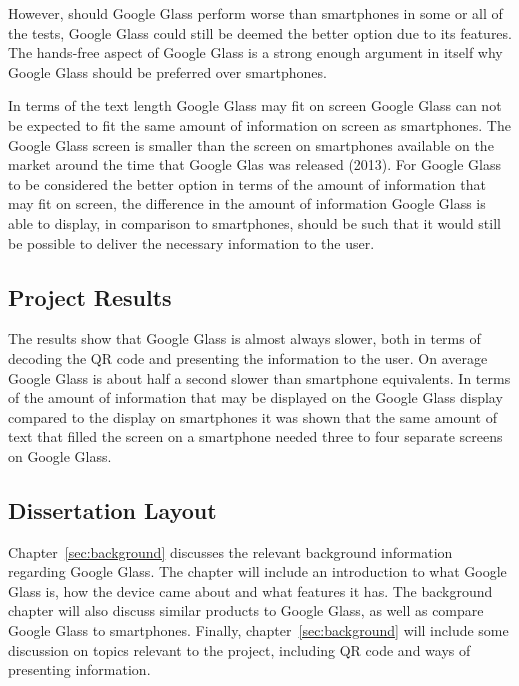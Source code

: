 However, should Google Glass perform worse than smartphones in some or all of the tests, Google Glass could still be deemed the better option due to its features. The hands-free aspect of Google Glass is a strong enough argument in itself why Google Glass should be preferred over smartphones. 


In terms of the text length Google Glass may fit on screen Google Glass can not be expected to fit the same amount of information on screen as smartphones. The Google Glass screen is smaller than the screen on smartphones available on the market around the time that Google Glas was released (2013). For Google Glass to be considered the better option in terms of the amount of information that may fit on screen, the difference in the amount of information Google Glass is able to display, in comparison to smartphones, should be such that it would still be possible to deliver the necessary information to the user.

\subsection{Project Results}
The results show that Google Glass is almost always slower, both in terms of decoding the QR code and presenting the information to the user. On average Google Glass is about half a second slower than smartphone equivalents. In terms of the amount of information that may be displayed on the Google Glass display compared to the display on smartphones it was shown that the same amount of text that filled the screen on a smartphone needed three to four separate screens on Google Glass.

\subsection{Dissertation Layout}
Chapter~\ref{sec:background} discusses the relevant background information regarding Google Glass. The chapter will include an introduction to what Google Glass is, how the device came about and what features it has. The background chapter will also discuss similar products to Google Glass, as well as compare Google Glass to smartphones. Finally, chapter~\ref{sec:background} will include some discussion on topics relevant to the project, including QR code and ways of presenting information.

